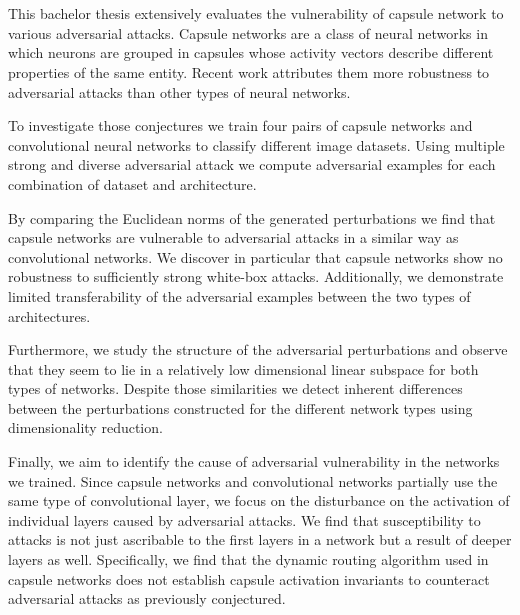 \section*{}

This bachelor thesis extensively evaluates the vulnerability of capsule network to various adversarial attacks.
Capsule networks are a class of neural networks in which neurons are grouped in capsules whose activity vectors describe different properties of the same entity.
Recent work attributes them more robustness to adversarial attacks than other types of neural networks.

To investigate those conjectures we train four pairs of capsule networks and convolutional neural networks to classify different image datasets.
Using multiple strong and diverse adversarial attack we compute adversarial examples for each combination of dataset and architecture.

By comparing the Euclidean norms of the generated perturbations we find that capsule networks are vulnerable to adversarial attacks in a similar way as convolutional networks.
We discover in particular that capsule networks show no robustness to sufficiently strong white-box attacks.
Additionally, we demonstrate limited transferability of the adversarial examples between the two types of architectures.

Furthermore, we study the structure of the adversarial perturbations and observe that they seem to lie in a relatively low dimensional linear subspace for both types of networks.
Despite those similarities we detect inherent differences between the perturbations constructed for the different network types using dimensionality reduction.

Finally, we aim to identify the cause of adversarial vulnerability in the networks we trained.
Since capsule networks and convolutional networks partially use the same type of convolutional layer, we focus on the disturbance on the activation of individual layers caused by adversarial attacks.
We find that susceptibility to attacks is not just ascribable to the first layers in a network but a result of deeper layers as well.
Specifically, we find that the dynamic routing algorithm used in capsule networks does not establish capsule activation invariants to counteract adversarial attacks as previously conjectured.